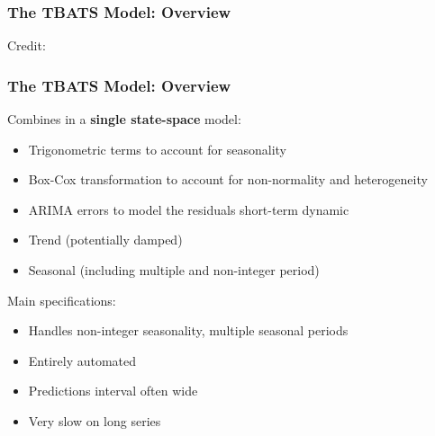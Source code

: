 \documentclass{beamer}
\newenvironment{wideitemize}{\itemize\addtolength{\itemsep}{10pt}}{\enditemize}
\begin{document}
    \begin{frame}
      \frametitle{The TBATS Model: Overview}
  \hspace*{15pt}\hbox{\scriptsize Credit:}      
    \end{frame}

    
  \begin{frame}
    \frametitle{The TBATS Model: Overview}

    \begin{wideitemize}
    \item Combines in a \textbf{single state-space} model:

      \begin{itemize}
      \item Trigonometric terms to account for seasonality
      \item Box-Cox transformation to account for non-normality and heterogeneity
      \item ARIMA errors to model the residuals short-term dynamic
      \item Trend (potentially damped)        
      \item Seasonal (including multiple and non-integer period)
      \end{itemize}

    \item Main specifications:
      \begin{itemize}
      \item Handles non-integer seasonality, multiple seasonal periods
      \item Entirely automated
      \item Predictions interval often wide
      \item Very slow on long series
      \end{itemize}      
    \end{wideitemize}
    \end{frame}
\end{document}
